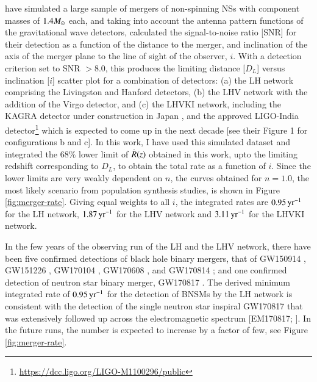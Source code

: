 \cite{Saleem_et_al.-2018-MNRAS} have simulated a large sample of mergers of non-spinning NSs with component masses of $1.4 M_{\odot}$ each, and taking into account the antenna pattern functions of the gravitational wave detectors, calculated the signal-to-noise ratio [SNR] for their detection as a function of the distance to the merger, and inclination of the axis of the merger plane to the line of sight of the observer, $i$. With a detection criterion set to SNR $> 8.0$, this produces the limiting distance [$D_L$] versus inclination [$i$] scatter plot for a combination of detectors: (a) the LH network comprising the Livingston and Hanford detectors, (b) the LHV network with the addition of the Virgo detector, and (c) the LHVKI network, including the KAGRA detector under construction in Japan \citep{Aso_et_al.-2013-PhRvD}, and the approved LIGO-India detector\footnote{\url{https://dcc.ligo.org/LIGO-M1100296/public}} which is expected to come up in the next decade [see their Figure 1 for configurations b and c]. In this work, I have used this simulated dataset and integrated the $68 \%$ lower limit of $\overset{.}{R}(z)$ obtained in this work, upto the limiting redshift corresponding to $D_L$, to obtain the total rate as a function of $i$. Since the lower limits are very weakly dependent on $n$, the curves obtained for $n = 1.0$, the most likely scenario from population synthesis studies, is shown in Figure \ref{fig:merger-rate}. Giving equal weights to all $i$, the integrated rates are $0.95 \, {\rm yr^{-1}}$ for the LH network, $1.87 \, {\rm yr^{-1}}$ for the LHV network and $3.11 \, {\rm yr^{-1}}$ for the LHVKI network.

In the few years of the observing run of the LH and the LHV network, there have been five confirmed detections of black hole binary mergers, that of GW150914 \citep{GW150914-2016}, GW151226 \citep{GW151226-2016}, GW170104 \citep{GW170104-2017}, GW170608 \citep{GW170608-2017}, and GW170814 \citep{GW170814-2017}; and one confirmed detection of neutron star binary merger, GW170817 \citep{GW170817-2017}. The derived minimum integrated rate of $0.95 \, {\rm yr^{-1}}$ for the detection of BNSMs by the LH network is consistent with the detection of the single neutron star inspiral GW170817 that was extensively followed up across the electromagnetic spectrum [EM170817; \cite{EM170817-2017}]. In the future runs, the number is expected to increase by a factor of few, see Figure \ref{fig:merger-rate}.

